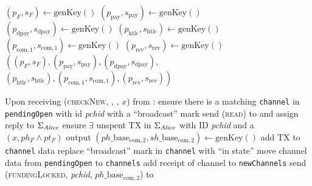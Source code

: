 \begin{algorithmic}[1]
     
      \State $\left(p_F, s_F\right) \gets \mathrm{genKey}\left(\right)$
      \State $\left(p_{\mathrm{pay}}, s_{\mathrm{pay}}\right) \gets
      \mathrm{genKey}\left(\right)$ 
      \State $\left(p_{\mathrm{dpay}}, s_{\mathrm{dpay}}\right) \gets
      \mathrm{genKey}\left(\right)$ 
      \State $\left(p_{\mathrm{htlc}}, s_{\mathrm{htlc}}\right) \gets
      \mathrm{genKey}\left(\right)$ 
      \State $\left(p_{\mathrm{com}, 1}, s_{\mathrm{com}, 1}\right) \gets
      \mathrm{genKey}\left(\right)$ 
      \State $\left(p_{\mathrm{rev}}, s_{\mathrm{rev}}\right) \gets
      \mathrm{genKey}\left(\right)$ 
      \State \Return $\left(\left(p_F, s_F\right), \left(p_{\mathrm{pay}},
      s_{\mathrm{pay}}\right), \left(p_{\mathrm{dpay}},
      s_{\mathrm{dpay}}\right),\right.$
      \Indent
        \State $\left.\left(p_{\mathrm{htlc}}, s_{\mathrm{htlc}}\right),
        \left(p_{\mathrm{com}, 1}, s_{\mathrm{com}, 1}\right),
        \left(p_{\mathrm{rev}}, s_{\mathrm{rev}}\right)\right)$
      \EndIndent
    \EndFunction
    \State

    \State {}
    \State Upon receiving (\textsc{checkNew}, \alice, \bob, $x$) from
    \environment: 
    \Indent
      \State ensure there is a matching \texttt{channel} in \texttt{pendingOpen}
      with id \textit{pchid} with a ``broadcast'' mark
      \State send (\textsc{read}) to \ledger{} and assign reply to
      $\Sigma_{\mathit{Alice}}$
      \State ensure $\exists$ unspent TX in $\Sigma_{\mathit{Alice}}$ with ID
      \textit{pchid} and a $\left(x, ph_F \wedge pt_F\right)$ output
      \State $\left(ph\_\mathrm{base}_{\mathrm{com}, 2},
      sh\_\mathrm{base}_{\mathrm{com}, 2}\right) \gets
      \mathrm{genKey}\left(\right)$
      \State add TX to \texttt{channel} data \State replace ``broadcast'' mark
      in \texttt{channel} with ``in state''
        \State move channel data from \texttt{pendingOpen} to \texttt{channels}
        \State add receipt of channel to \texttt{newChannels}
      \EndIf
      \State send (\textsc{fundingLocked}, \textit{pchid},
      $ph\_\mathrm{base}_{\mathrm{com}, 2}$) to \bob{}
    \EndIndent
    \State


\end{algorithmic}
